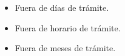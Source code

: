 \begin{PDescripcion}
\begin{enumerate}
      \begin{itemize}
        \item Fuera de días de trámite.
        \item Fuera de horario de trámite.
        \item Fuera de meses de trámite.
      \end{itemize}

    \end{enumerate}

\end{PDescripcion}